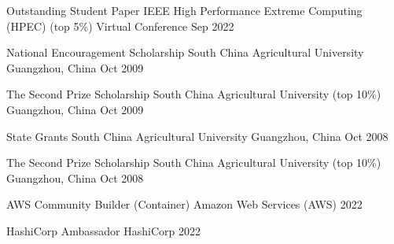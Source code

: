 



\begin{cvhonors}

  \cvhonor
    {Outstanding Student Paper} %
    {IEEE High Performance Extreme Computing (HPEC) (top 5\%)} %
    {Virtual Conference} %
    {Sep 2022} %

  \cvhonor
    {National Encouragement Scholarship} %
    {South China Agricultural University} %
    {Guangzhou, China} %
    {Oct 2009} %

  \cvhonor
    {The Second Prize Scholarship} %
    {South China Agricultural University (top 10\%)} %
    {Guangzhou, China} %
    {Oct 2009} %

  \cvhonor
    {State Grants} %
    {South China Agricultural University} %
    {Guangzhou, China} %
    {Oct 2008} %

  \cvhonor
    {The Second Prize Scholarship} %
    {South China Agricultural University (top 10\%)} %
    {Guangzhou, China} %
    {Oct 2008} %

\end{cvhonors}



\begin{cvhonors}

  \cvhonor
    {AWS Community Builder (Container)} %
    {Amazon Web Services (AWS)} %
    {} %
    {2022} %

  \cvhonor
    {HashiCorp Ambassador} %
    {HashiCorp} %
    {} %
    {2022} %

\end{cvhonors}
